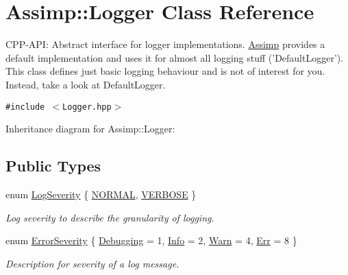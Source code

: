 \hypertarget{class_assimp_1_1_logger}{
\section{Assimp::Logger Class Reference}
\label{class_assimp_1_1_logger}
}
CPP-API: Abstract interface for logger implementations. \hyperlink{namespace_assimp}{Assimp} provides a default implementation and uses it for almost all logging stuff ('DefaultLogger'). This class defines just basic logging behaviour and is not of interest for you. Instead, take a look at DefaultLogger.  


{\tt \#include $<$Logger.hpp$>$}

Inheritance diagram for Assimp::Logger:\subsection*{Public Types}
\begin{CompactItemize}
\item 
enum \hyperlink{class_assimp_1_1_logger_8b6248a0fd062431e8572556350d29e6}{LogSeverity} \{ \hyperlink{class_assimp_1_1_logger_8b6248a0fd062431e8572556350d29e679d16f85dc21486ee489f300027e8eda}{NORMAL}, 
\hyperlink{class_assimp_1_1_logger_8b6248a0fd062431e8572556350d29e6fc9d1d86aa82fdb80e00c99b3c1ce486}{VERBOSE}
 \}
\begin{CompactList}\small\item\em Log severity to describe the granularity of logging. \item\end{CompactList}\item 
enum \hyperlink{class_assimp_1_1_logger_cd0b52a87d6fc11e957ed2c6e2ad75b6}{ErrorSeverity} \{ \hyperlink{class_assimp_1_1_logger_cd0b52a87d6fc11e957ed2c6e2ad75b60cb475014d27098c3423738c571d857f}{Debugging} =  1, 
\hyperlink{class_assimp_1_1_logger_cd0b52a87d6fc11e957ed2c6e2ad75b6a3377a574928b86f7de55c5df154f461}{Info} =  2, 
\hyperlink{class_assimp_1_1_logger_cd0b52a87d6fc11e957ed2c6e2ad75b61279c77aaee5a3d7df835a9b9305a697}{Warn} =  4, 
\hyperlink{class_assimp_1_1_logger_cd0b52a87d6fc11e957ed2c6e2ad75b671054d0b1323abcea46d050d69013d27}{Err} =  8
 \}
\begin{CompactList}\small\item\em Description for severity of a log message. \item\end{CompactList}\end{CompactItemize}
